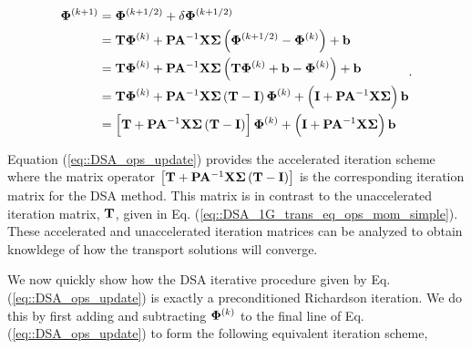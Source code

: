 \begin{equation}
\label{eq::DSA_ops_update}
\begin{aligned}
{\bf \Phi}^{(k+1)} &= {\bf \Phi}^{(k+1/2)} + \delta {\bf \Phi}^{(k+1/2)} \\
&= {\bf T}  {\bf \Phi}^{(k)}  + {\bf P} {\bf A}^{-1} {\bf X} {\bf \Sigma} \left( {\bf \Phi}^{(k+1/2)} - {\bf \Phi}^{(k)}  \right)  +  {\bf b} \\
&= {\bf T}  {\bf \Phi}^{(k)}  + {\bf P} {\bf A}^{-1} {\bf X} {\bf \Sigma} \left(  {\bf T}  {\bf \Phi}^{(k)} +  {\bf b} - {\bf \Phi}^{(k)}  \right)  +  {\bf b}  \\
&= {\bf T}  {\bf \Phi}^{(k)}  + {\bf P} {\bf A}^{-1} {\bf X} {\bf \Sigma} \left(  {\bf T}    - {\bf I} \right)  {\bf \Phi}^{(k)} + \left( {\bf I}+ {\bf P} {\bf A}^{-1}  {\bf X} {\bf \Sigma}   \right) {\bf b} \\
&= \left[ {\bf T}  + {\bf P} {\bf A}^{-1} {\bf X} {\bf \Sigma} \left(  {\bf T}    - {\bf I} \right) \right] {\bf \Phi}^{(k)}  + \left({\bf I}+  {\bf P} {\bf A}^{-1}  {\bf X} {\bf \Sigma}  \right) {\bf b}
\end{aligned} .
\end{equation}

\noindent Equation (\ref{eq::DSA_ops_update}) provides the accelerated iteration scheme where the matrix operator $\left[ {\bf T}  + {\bf P} {\bf A}^{-1} {\bf X} {\bf \Sigma} \left(  {\bf T}    - {\bf I} \right) \right]$ is the corresponding iteration matrix for the DSA method. This matrix is in contrast to the unaccelerated iteration matrix, ${\bf T}$, given in Eq. (\ref{eq::DSA_1G_trans_eq_ops_mom_simple}). These accelerated and unaccelerated iteration matrices can be analyzed to obtain knowldege of how the transport solutions will converge.

We now quickly show how the DSA iterative procedure given by Eq. (\ref{eq::DSA_ops_update}) is exactly a preconditioned Richardson iteration. We do this by first adding and subtracting ${\bf \Phi}^{(k)}$ to the final line of Eq. (\ref{eq::DSA_ops_update}) to form the following equivalent iteration scheme,

